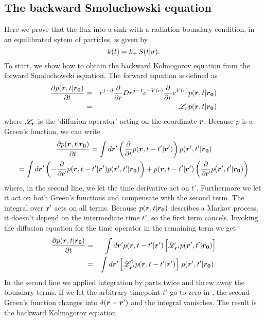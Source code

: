 \subsection{ The backward Smoluchowski equation}
Here we prove that the flux into a sink with a radiation boundary condition, in an equilibrated sytem of particles, is given by
\begin{equation}
 k(t) = k_+ \, S(t|\sigma).
 \elabel{bsm_k}
\end{equation}
To start, we show how to obtain the backward Kolmogorov equation from the forward Smoluchowski equation. The forward equation is defined as
\begin{eqnarray}
 \frac{\partial p(\boldsymbol{r},t|\boldsymbol{r_0})}{\partial t} & = & r^{1-d} \frac{\partial }{\partial r} D r^{d-1} e^{-V(r)} \frac{\partial }{\partial r} e^{V(r)} p(\boldsymbol{r},t|\boldsymbol{r_0}) \\
 & = & \mathscr{L}_{\boldsymbol{r}} p(\boldsymbol{r},t|\boldsymbol{r_0})
\end{eqnarray}
where $\mathscr{L}_{\boldsymbol{r}}$ is the 'diffusion operator' acting on the coordinate $\boldsymbol{r}$. Because $p$ is a Green's function, we can write
\begin{multline}
\frac{\partial p(\boldsymbol{r},t|\boldsymbol{r_0})}{\partial t} = \int d\boldsymbol{r}' \left(\frac{\partial }{\partial t} p(\boldsymbol{r},t-t'|\boldsymbol{r}') \right) p(\boldsymbol{r}',t'|\boldsymbol{r_0}) \\
 = \int d\boldsymbol{r}' \left( - \frac{\partial }{\partial t'} p(\boldsymbol{r},t - t'|\boldsymbol{r}') p(\boldsymbol{r}',t'|\boldsymbol{r_0}) \right) + p(\boldsymbol{r},t - t'|\boldsymbol{r}') \left( \frac{\partial }{\partial t'} p(\boldsymbol{r}',t'|\boldsymbol{r_0}) \right) 
\end{multline}
where, in the second line, we let the time derivative act on $t'$. Furthermore we let it act on both Green's functions and compensate with the second term. The integral over ${\bf r'}$ acts on all terms. Because $p(\boldsymbol{r},t|\boldsymbol{r_0})$ describes a Markov process, it doesn't depend on the intermediate time $t'$, so the first term cancels. Invoking the diffusion equation for the time operator in the remaining term we get
\begin{eqnarray}
 \pdiff{p(\vect{r},t|\vect{r_0})}{t} & = & \int d\vect{r}' p(\vect{r},t - t'|\vect{r}') \left[ \mathscr{L}_{\vect{r}'}^{\phantom{\dag}} p(\vect{r}',t'|\vect{r_0}) \right] \\
 & = & \int d\vect{r}' \left[ \mathscr{L}_{\vect{r'}}^{\dag} p(\vect{r},t - t'|\vect{r}') \right] \, p(\vect{r}',t'|\vect{r_0}). \elabel{bsm_1}
\end{eqnarray}
In the second line we applied integration by parts twice and threw away the boundary terms. If we let the arbitrary timepoint $t'$ go to zero in , the second Green's function changes into $\delta(\boldsymbol{r}-\boldsymbol{r}')$ and the integral vanisches. The result is the backward Kolmogorov equation
